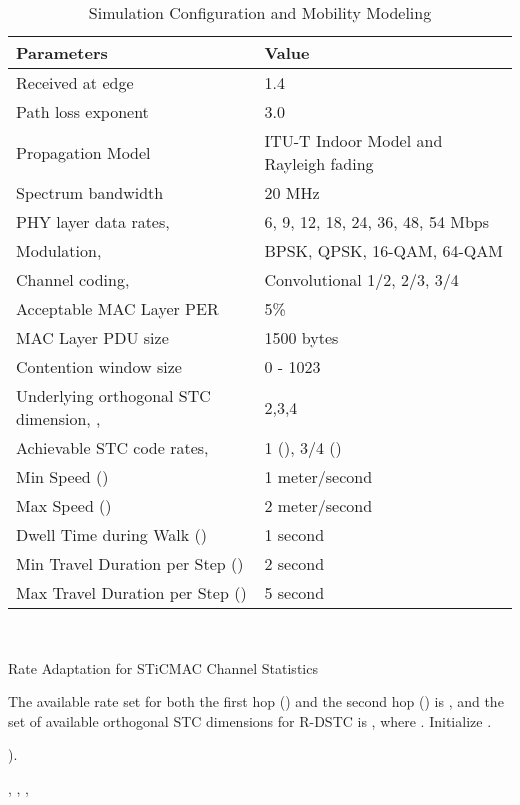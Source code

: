 \documentclass[peerreview,draftcls,onecolumn,12pt,a4paper]{IEEEtran}
\begin{document}
\begin{table}[h!]\small
\begin{minipage}[b]{1\linewidth}
 \caption{Simulation Configuration and Mobility Modeling}
\vspace{.01in} \centering
\begin{tabular}{l||l} \hline
\label{tab:WLANConfig} \textbf{Parameters} & \textbf{Value}
\\ \hline \hline Received  at edge & 1.4 \\ \hline
Path loss exponent & 3.0\\ \hline Propagation Model & ITU-T Indoor Model and Rayleigh fading \\
\hline Spectrum bandwidth& 20 MHz \\
\hline
PHY layer data rates,  & 6, 9, 12, 18, 24, 36, 48, 54 Mbps\\
\hline
Modulation,  & BPSK, QPSK, 16-QAM, 64-QAM\\
\hline Channel coding,  & Convolutional 1/2, 2/3, 3/4 \cite{80211-2007}\\
\hline Acceptable MAC Layer PER  & 5\%\\
\hline MAC Layer PDU size& 1500 bytes \\
\hline
Contention window size& 0 - 1023 \\
\hline Underlying orthogonal STC dimension, , & 2,3,4 \\
\hline Achievable STC code rates,  & 1 (), 3/4
()
\\ \hline \hline Min Speed () & 1 meter/second \\ \hline
Max Speed () & 2 meter/second\\ \hline  Dwell Time during Walk () & 1 second \\
\hline
Min Travel Duration per Step () &  2 second\\
\hline
Max Travel Duration per Step () &  5 second \\
\hline
\end{tabular}
\end{minipage} \\
\end{table}

\newpage
\begin{algorithm}
\begin{minipage}{1\linewidth}
\caption{Rate Adaptation for STiCMAC Channel Statistics}          \begin{algorithmic}[1]
 \label{channelstatisticssearch}
\small \STATE The available rate set for both the
first hop () and the second hop () is , and the set of available orthogonal STC
dimensions for R-DSTC is , where . {Initialize }.

 ).

 \STATE ,
, , \ \ENDIF

\ENDFOR
\end{algorithmic}
\end{minipage} \\
\end{algorithm}
\end{document}
